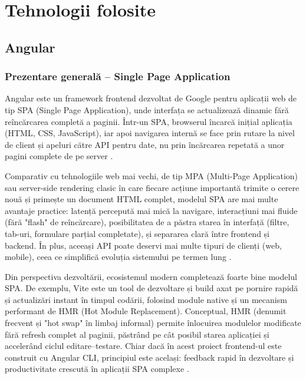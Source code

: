 \chapter{Tehnologii folosite}
\label{cap:tehnologii}

\section{Angular}

\subsection{Prezentare generală -- Single Page Application}
Angular este un framework frontend dezvoltat de Google pentru aplicații web de tip SPA (Single Page Application), unde interfața se actualizează dinamic fără reîncărcarea completă a paginii. Într-un SPA, browserul încarcă inițial aplicația (HTML, CSS, JavaScript), iar apoi navigarea internă se face prin rutare la nivel de client și apeluri către API pentru date, nu prin încărcarea repetată a unor pagini complete de pe server \cite{google_angular_2024,takada_spa_2024}.

Comparativ cu tehnologiile web mai vechi, de tip MPA (Multi-Page Application) sau server-side rendering clasic în care fiecare acțiune importantă trimite o cerere nouă și primește un document HTML complet, modelul SPA are mai multe avantaje practice: latență percepută mai mică la navigare, interacțiuni mai fluide (fără "flash" de reîncărcare), posibilitatea de a păstra starea în interfață (filtre, tab-uri, formulare parțial completate), și separarea clară între frontend și backend. În plus, aceeași API poate deservi mai multe tipuri de clienți (web, mobile), ceea ce simplifică evoluția sistemului pe termen lung \cite{sciencedirect_client_server_2026,aws_restful_2024}.

Din perspectiva dezvoltării, ecosistemul modern completează foarte bine modelul SPA. De exemplu, Vite este un tool de dezvoltare și build axat pe pornire rapidă și actualizări instant în timpul codării, folosind module native și un mecanism performant de HMR (Hot Module Replacement). Conceptual, HMR (denumit frecvent și "hot swap" în limbaj informal) permite înlocuirea modulelor modificate fără refresh complet al paginii, păstrând pe cât posibil starea aplicației și accelerând ciclul editare--testare. Chiar dacă în acest proiect frontend-ul este construit cu Angular CLI, principiul este același: feedback rapid în dezvoltare și productivitate crescută în aplicații SPA complexe \cite{google_angular_cli_2026,vite_docs_2026,vite_hmr_2026}.

